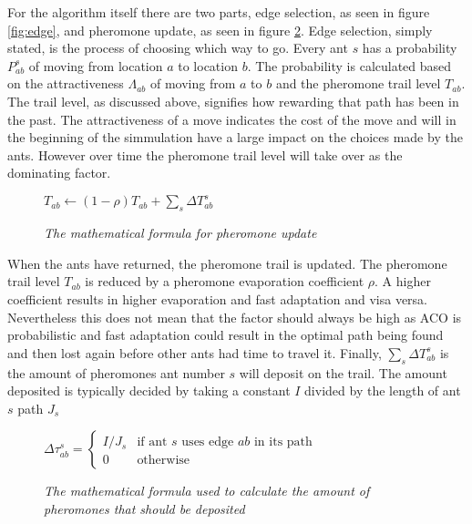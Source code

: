 For the algorithm itself there are two parts, edge selection, as seen in figure \ref{fig:edge}, and pheromone update, as seen in figure \ref{fig:update}. 
Edge selection, simply stated, is the process of choosing which way to go. Every ant $s$ has a probability $P^s_{ab}$ of moving from location $a$ to location $b$. The probability
is calculated based on the attractiveness $\Lambda_{ab}$  of moving from $a$ to $b$ and the pheromone trail level $T_{ab}$. The trail level,
as discussed above, signifies how rewarding that path has been in the past. The attractiveness of a move indicates the cost of the move and 
will in the beginning of the simmulation have a large impact on the choices made by the ants. However over time the pheromone trail level will take over as the
dominating factor.

\begin{figure}[h]
\centering
\begin{math}
T_{ab} \leftarrow (1 - \rho)T_{ab} + \sum \limits_{s} \Delta T^s_{ab}
\end{math}
\caption{\textit{The mathematical formula for pheromone update}}
\label{fig:update}
\end{figure}

When the ants have returned, the pheromone trail is updated. The pheromone trail level $T_{ab}$ is reduced by a pheromone evaporation
coefficient $\rho$. A higher coefficient results in higher evaporation and fast adaptation and visa versa. Nevertheless this does not mean
that the factor should always be high as ACO is probabilistic and fast adaptation could result in the optimal path being found and then lost
again before other ants had time to travel it. Finally, $\sum \limits_{s} \Delta T^s_{ab}$ is the amount of pheromones ant number $s$ will deposit on
the trail. The amount deposited is typically decided by taking a constant $I$ divided by the length of ant $s$ path $J_s$

\begin{figure}[h]
\centering
\begin{math}
\Delta \tau^{s}_{ab} =
\begin{cases}
I/J_s & \mbox{if ant }s\mbox{ uses edge }ab\mbox{ in its path} \\
0 & \mbox{otherwise}
\end{cases}
\end{math}
\caption{\textit{The mathematical formula used to calculate the amount of pheromones that should be deposited}}
\label{fig:update}
\end{figure}


